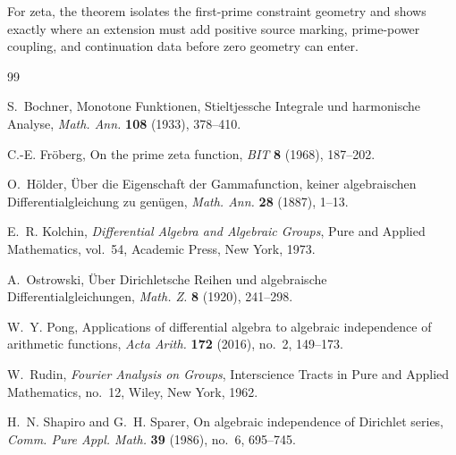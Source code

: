 \documentclass[11pt]{article}
\theoremstyle{definition}
\theoremstyle{remark}
\begin{document}
For zeta, the theorem isolates the first-prime constraint geometry and shows exactly where an
extension must add positive source marking, prime-power coupling, and continuation data before
zero geometry can enter.

\begin{thebibliography}{99}

S.~Bochner,
Monotone Funktionen, Stieltjessche Integrale und harmonische Analyse,
\emph{Math. Ann.} \textbf{108} (1933), 378--410.

C.-E. Fr\"oberg,
On the prime zeta function,
\emph{BIT} \textbf{8} (1968), 187--202.

O.~H\"older,
\"Uber die Eigenschaft der Gammafunction, keiner algebraischen Differentialgleichung zu
gen\"ugen,
\emph{Math. Ann.} \textbf{28} (1887), 1--13.

E.~R. Kolchin,
\emph{Differential Algebra and Algebraic Groups},
Pure and Applied Mathematics, vol.~54, Academic Press, New York, 1973.

A.~Ostrowski,
\"Uber Dirichletsche Reihen und algebraische Differentialgleichungen,
\emph{Math. Z.} \textbf{8} (1920), 241--298.

W.~Y. Pong,
Applications of differential algebra to algebraic independence of arithmetic functions,
\emph{Acta Arith.} \textbf{172} (2016), no.~2, 149--173.

W.~Rudin,
\emph{Fourier Analysis on Groups},
Interscience Tracts in Pure and Applied Mathematics, no.~12, Wiley, New York, 1962.

H.~N. Shapiro and G.~H. Sparer,
On algebraic independence of Dirichlet series,
\emph{Comm. Pure Appl. Math.} \textbf{39} (1986), no.~6, 695--745.

\end{thebibliography}
\end{document}
